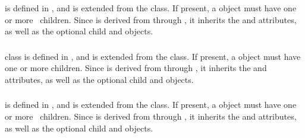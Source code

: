 \subsubsection{}
\label{def:ListOfSpeciesTypeInstances}

 is defined in , and is extended from the  class. If present, \mBlockChangedBegin{\revTwentyTwentyMarch} a   object\mBlockChangedEnd{\revTwentyTwentyMarch} must have one or more \SpeciesTypeInstance\ children.  Since  is derived from  through , it inherits the  and  attributes, as well as the optional \mBlockChangedBegin{\revTwentyTwentyMarch}child\mBlockChangedEnd{\revTwentyTwentyMarch}  and  objects. 

\subsubsection{}
\label{def:ListOfInSpeciesTypeBonds}

 class is defined in , and is extended from the  class. If present, \mBlockChangedBegin{\revTwentyTwentyMarch} a   object\mBlockChangedEnd{\revTwentyTwentyMarch} must have one or more \InSpeciesTypeBond children.  Since  is derived from  through , it inherits the  and  attributes, as well as the optional \mBlockChangedBegin{\revTwentyTwentyMarch}child\mBlockChangedEnd{\revTwentyTwentyMarch}  and  objects. 

\subsubsection{}
\label{def:ListOfSpeciesTypeComponentIndexes}

 is defined in , and is extended from the  class. If present, \mBlockChangedBegin{\revTwentyTwentyMarch} a   object\mBlockChangedEnd{\revTwentyTwentyMarch} must have one or more \SpeciesTypeComponentIndex\ children.  Since  is derived from  through , it inherits the  and  attributes, as well as the optional \mBlockChangedBegin{\revTwentyTwentyMarch}child\mBlockChangedEnd{\revTwentyTwentyMarch}  and  objects. 

